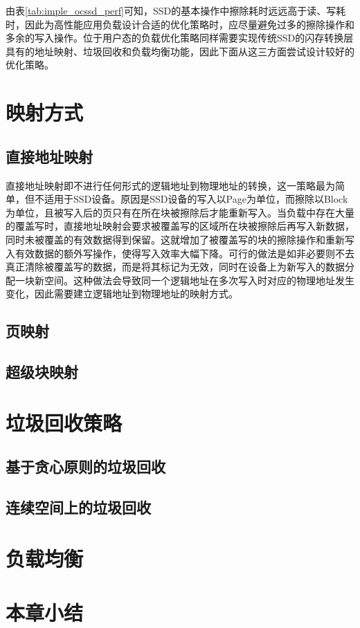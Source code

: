 由表\ref{tab:imple_ocssd_perf}可知，SSD的基本操作中擦除耗时远远高于读、写耗时，因此为高性能应用负载设计合适的优化策略时，应尽量避免过多的擦除操作和多余的写入操作。位于用户态的负载优化策略同样需要实现传统SSD的闪存转换层具有的地址映射、垃圾回收和负载均衡功能，因此下面从这三方面尝试设计较好的优化策略。

\section{映射方式}
\subsection{直接地址映射}
直接地址映射即不进行任何形式的逻辑地址到物理地址的转换，这一策略最为简单，但不适用于SSD设备。原因是SSD设备的写入以Page为单位，而擦除以Block为单位，且被写入后的页只有在所在块被擦除后才能重新写入。当负载中存在大量的覆盖写时，直接地址映射会要求被覆盖写的区域所在块被擦除后再写入新数据，同时未被覆盖的有效数据得到保留。这就增加了被覆盖写的块的擦除操作和重新写入有效数据的额外写操作，使得写入效率大幅下降。可行的做法是如非必要则不去真正清除被覆盖写的数据，而是将其标记为无效，同时在设备上为新写入的数据分配一块新空间。这种做法会导致同一个逻辑地址在多次写入时对应的物理地址发生变化，因此需要建立逻辑地址到物理地址的映射方式。
\subsection{页映射}

\subsection{超级块映射}

\section{垃圾回收策略}
\subsection{基于贪心原则的垃圾回收}
\subsection{连续空间上的垃圾回收}

\section{负载均衡}

\section{本章小结}